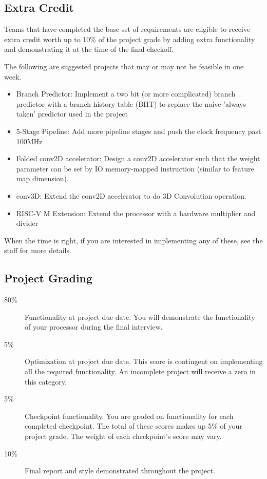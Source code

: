 \documentclass[11pt]{article}
\begin{document}
\subsection{Extra Credit}
\label{extra_credit}
Teams that have completed the base set of requirements are eligible to receive extra credit worth up to 10\% of the project grade by adding extra functionality and demonstrating it at the time of the final checkoff.

The following are suggested projects that may or may not be feasible in one week.
\begin{itemize}
  \item Branch Predictor: Implement a two bit (or more complicated) branch predictor with a branch history table (BHT) to replace the naive 'always taken' predictor used in the project
  \item 5-Stage Pipeline: Add more pipeline stages and push the clock frequency past 100MHz
  \item Folded conv2D accelerator: Design a conv2D accelerator such that the weight parameter can be set by IO memory-mapped instruction (similar to feature map dimension).
  \item conv3D: Extend the conv2D accelerator to do 3D Convolution operation.
  \item RISC-V M Extension: Extend the processor with a hardware multiplier and divider
\end{itemize}

When the time is right, if you are interested in implementing any of these, see the staff for more details.

\subsection{Project Grading}
\label{deadlinegrading}

\begin{description}
  \item[80\%] {Functionality} at project due date. You will demonstrate the functionality of your processor during the final interview.
  \item[5\%] {Optimization} at project due date. This score is contingent on implementing all the required functionality. An incomplete project will receive a zero in this category.
  \item[5\%] {Checkpoint} functionality. You are graded on functionality for each completed checkpoint. The total of these scores makes up 5\% of your project grade. The weight of each checkpoint's score may vary.
  \item[10\%] {Final report} and {style} demonstrated throughout the project.
\end{description}
\end{document}
